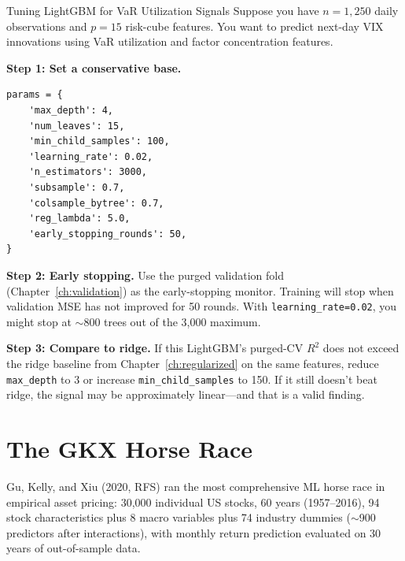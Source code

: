 \begin{workedexample}{Tuning LightGBM for VaR Utilization Signals}
Suppose you have $n = 1{,}250$ daily observations and $p = 15$ risk-cube features.
You want to predict next-day VIX innovations using VaR utilization and factor concentration features.

\textbf{Step 1: Set a conservative base.}
\begin{verbatim}
params = {
    'max_depth': 4,
    'num_leaves': 15,
    'min_child_samples': 100,
    'learning_rate': 0.02,
    'n_estimators': 3000,
    'subsample': 0.7,
    'colsample_bytree': 0.7,
    'reg_lambda': 5.0,
    'early_stopping_rounds': 50,
}
\end{verbatim}

\textbf{Step 2: Early stopping.}
Use the purged validation fold (Chapter~\ref{ch:validation}) as the early-stopping monitor.
Training will stop when validation MSE has not improved for 50 rounds.
With \texttt{learning\_rate=0.02}, you might stop at $\sim$800 trees out of the 3,000 maximum.

\textbf{Step 3: Compare to ridge.}
If this LightGBM's purged-CV $R^2$ does not exceed the ridge baseline from Chapter~\ref{ch:regularized} on the same features, reduce \texttt{max\_depth} to 3 or increase \texttt{min\_child\_samples} to 150.
If it still doesn't beat ridge, the signal may be approximately linear---and that is a valid finding.
\end{workedexample}

\section{The GKX Horse Race}
\label{sec:gkx-horse-race}

Gu, Kelly, and Xiu (2020, RFS) ran the most comprehensive ML horse race in empirical asset pricing: 30,000 individual US stocks, 60 years (1957--2016), 94 stock characteristics plus 8 macro variables plus 74 industry dummies ($\sim$900 predictors after interactions), with monthly return prediction evaluated on 30 years of out-of-sample data.

